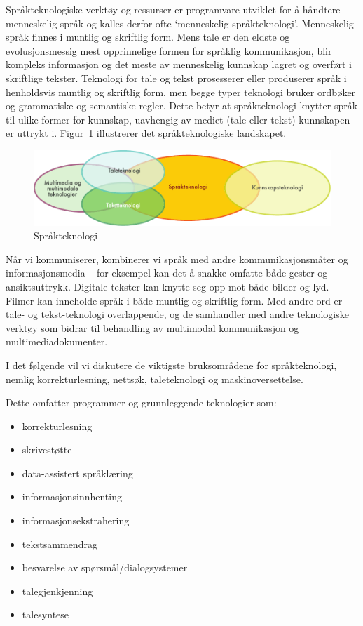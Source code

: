 \begin{multicols}{2}

Språkteknologiske verktøy og ressurser er programvare utviklet for å håndtere menneskelig språk og kalles derfor ofte `menneskelig språkteknologi'. 
Menneskelig språk finnes i muntlig og skriftlig form. Mens tale er den eldste og evolusjonsmessig mest opprinnelige formen for språklig kommunikasjon, blir kompleks informasjon og det meste av menneskelig kunnskap lagret og overført i skriftlige tekster. Teknologi for tale og tekst prosesserer eller produserer språk i henholdsvis muntlig og skriftlig form, men begge typer teknologi bruker ordbøker og grammatiske og semantiske regler. Dette betyr at språkteknologi knytter språk til ulike former for kunnskap, uavhengig av mediet (tale eller tekst) kunnskapen er uttrykt i. Figur~\ref{fig:ltincontext_no} illustrerer det språkteknologiske landskapet.

\begin{figure}[htb]
  \center
  \includegraphics[width=\textwidth]{../_media/norwegian-bokmaal/language_technologies}
  \caption{Språkteknologi}
  \label{fig:ltincontext_no}
\end{figure}

Når vi kommuniserer, kombinerer vi språk med andre kommunikasjonsmåter
og informasjonsmedia -- for eksempel kan det å snakke omfatte både
gester og ansiktsuttrykk. Digitale tekster kan knytte seg opp mot både
bilder og lyd. Filmer kan inneholde språk i både muntlig og skriftlig
form. Med andre ord er tale- og tekst-teknologi overlappende, og de
samhandler med andre teknologiske verktøy som bidrar til behandling av
multimodal kommunikasjon og multimediadokumenter.

I det følgende vil vi diskutere de viktigste bruksområdene for språkteknologi, nemlig korrekturlesning, nettsøk, taleteknologi og maskinoversettelse. 

Dette omfatter programmer og grunnleggende teknologier som:

\begin{itemize}
\item korrekturlesning
\item skrivestøtte
\item data-assistert språklæring
\item informasjonsinnhenting  
\item informasjonsekstrahering
\item tekstsammendrag
\item besvarelse av spørsmål/dialogsystemer
\item talegjenkjenning 
\item talesyntese 
\end{itemize}


\end{multicols}
